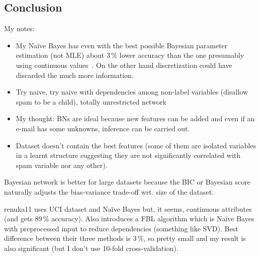 \documentclass[english,cover]{fitthesis} %
\newcommand{\todo}[1]{{\color{red}#1}}
\begin{document}
\subsection{Conclusion}



\bigskip
My notes:
\begin{itemize}
    \item My Naïve Bayes has even with the best possible Bayesian parameter estimation (not MLE) about 3\,\% lower accuracy than the one presumably using continuous values~\cite{renuka11}. On the other hand discretization could have discarded the much more information.
    \item Try naive, try naive with dependencies among non-label variables (disallow spam to be a child), totally unrestricted network
    \item My thought: BNs are ideal because new features can be added and even if an e-mail has some unknowns, inference can be carried out.
    \item Dataset doesn't contain the best features (some of them are isolated variables in a learnt structure suggesting they are not significantly correlated with spam variable nor any other).
\end{itemize}


\bigskip

\todo{
Bayesian network is better for large datasets because the BIC or Bayesian score naturally adjusts the bias-variance trade-off wrt. size of the dataset.

renuka11 uses UCI dataset and Naïve Bayes but, it seems, continuous attributes (and gets 89\,\% accuracy). Also introduces a FBL algorithm which is Naïve Bayes with preprocessed input to reduce dependencies (something like SVD). Best difference between their three methods is 3\,\%, so pretty small and my result is also significant (but I don't use 10-fold cross-validation).
}
\end{document}
